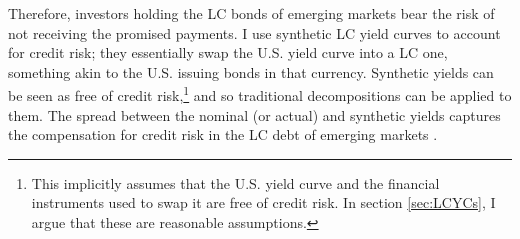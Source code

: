 {%
Therefore, investors holding the LC bonds of emerging markets bear the risk of not receiving the promised payments.
I use synthetic LC yield curves to account for credit risk; they essentially swap the U.S. yield curve into a LC one,
something akin to the U.S. issuing bonds in that currency.
Synthetic yields can be seen as free of credit risk,\footnote{ This implicitly assumes that the U.S. yield curve and the financial instruments used to swap it are free of credit risk. In section \ref{sec:LCYCs}, I argue that these are reasonable assumptions.} and so traditional decompositions can be applied to them.
The spread between the nominal (or actual) and synthetic yields captures the compensation for credit risk in the LC debt of emerging markets \citep{DuSchreger:2016JoF}.

}

